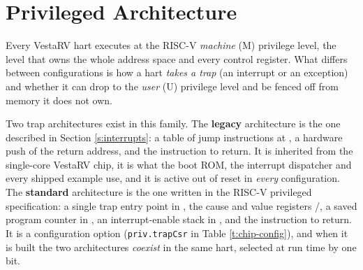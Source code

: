 \chapter{Privileged Architecture} \label{s:privarch}

Every VestaRV hart executes at the RISC-V \textit{machine} (M) privilege level, the level that owns the whole address space and every control register. What differs between configurations is how a hart \textit{takes a trap} (an interrupt or an exception) and whether it can drop to the \textit{user} (U) privilege level and be fenced off from memory it does not own.

Two trap architectures exist in this family. The \textbf{legacy} architecture is the one described in Section \ref{s:interrupts}: a table of jump instructions at \texttt{\VectorsStartAddress}, a hardware push of the return address, and the  instruction to return. It is inherited from the single-core VestaRV chip, it is what the boot ROM, the interrupt dispatcher and every shipped example use, and it is active out of reset in \textit{every} configuration. The \textbf{standard} architecture is the one written in the RISC-V privileged specification: a single trap entry point in , the cause and value registers /, a saved program counter in , an interrupt-enable stack in , and the  instruction to return. It is a configuration option (\texttt{priv.trapCsr} in Table \ref{t:chip-config}), and when it is built the two architectures \textit{coexist} in the same hart, selected at run time by one bit.

